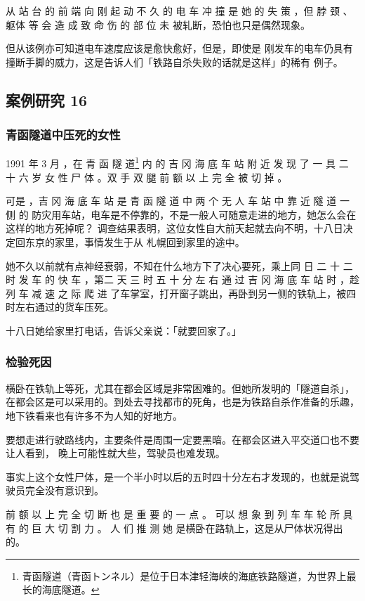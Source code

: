 \documentclass[UTF8]{ctexart}
\begin{document}
从 站 台 的 前 端 向 刚 起 动 不 久 的 电 车 冲 撞 是 她 的 失 策 ，但 脖 颈 、躯体 等 会 造 成 致 命 伤 的 部 位 未 被轧断，恐怕也只是偶然现象。

但从该例亦可知道电车速度应该是愈快愈好，但是，即使是 刚发车的电车仍具有撞断手脚的威力，这是告诉人们「铁路自杀失败的话就是这样」的稀有 例子。

\subsection{案例研究 16}

\subsubsection*{青函隧道中压死的女性}

1991 年 3 月 ，在 青 函 隧 道\footnote{青函隧道（青函トンネル）是位于日本津轻海峡的海底铁路隧道，为世界上最长的海底隧道。} 内 的 吉 冈 海 底 车 站 附 近 发 现 了 一 具 二 十 六 岁 女 性 尸 体 。双 手 双 腿 前 额 以 上 完 全 被 切 掉 。

可是 ，吉 冈 海 底 车 站 是 青 函 隧 道 中 两 个 无 人 车 站 中 靠 近 隧 道 一 侧 的 防灾用车站，电车是不停靠的，不是一般人可随意走进的地方，她怎么会在这样的地方死掉呢？ 调查结果表明，这位女性自大前天起就去向不明，十八日决定回东京的家里，事情发生于从 札幌回到家里的途中。

她不久以前就有点神经衰弱，不知在什么地方下了决心要死，乘上同 日 二 十 二 时 发 车 的 快 车 ，第二 天 三 时 五 十 分 左 右 通 过 吉 冈 海 底 车 站 时 ，趁 列 车 减 速 之 际 爬 进 了车掌室，打开窗子跳出，再卧到另一侧的铁轨上，被四时左右通过的货车压死。 

十八日她给家里打电话，告诉父亲说：「就要回家了。」

\subsubsection*{检验死因}

横卧在铁轨上等死，尤其在都会区域是非常困难的。但她所发明的「隧道自杀」，在都会区是可以采用的。到处去寻找都市的死角，也是为铁路自杀作准备的乐趣，地下铁看来也有许多不为人知的好地方。

要想走进行驶路线内，主要条件是周围一定要黑暗。在都会区进入平交道口也不要让人看到， 晚上可能性就大些，驾驶员也难发现。

事实上这个女性尸体，是一个半小时以后的五时四十分左右才发现的，也就是说驾驶员完全没有意识到。 

前 额 以 上 完 全 切 断 也 是 重 要 的 一 点 。
可以 想 象 到 列 车 车 轮 所 具 有 的 巨 大 切 割 力 。
人 们 推 测 她 是横卧在路轨上，这是从尸体状况得出的。
\end{document}
